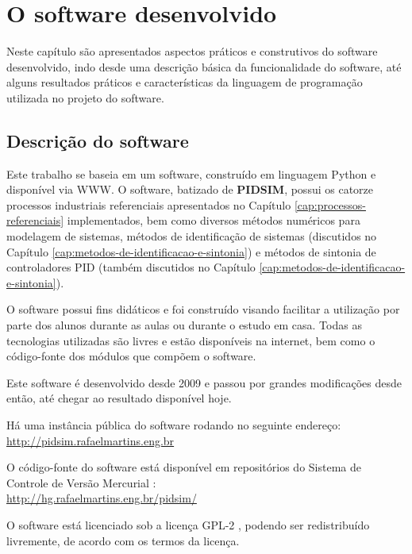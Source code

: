 \chapter{O software desenvolvido \label{cap:software}}

Neste capítulo são apresentados aspectos práticos e construtivos do
software desenvolvido, indo desde uma descrição básica da funcionalidade
do software, até alguns resultados práticos e características da linguagem
de programação utilizada no projeto do software.

\section{Descrição do software}

    Este trabalho se baseia em um software, construído em linguagem Python
    e disponível via \ac{WWW}. O software, batizado de \textbf{PIDSIM},
    possui os catorze processos industriais referenciais apresentados no Capítulo
    \ref{cap:processos-referenciais} implementados, bem como diversos
    métodos numéricos para modelagem de sistemas, métodos de identificação
    de sistemas (discutidos no Capítulo
    \ref{cap:metodos-de-identificacao-e-sintonia}) e métodos de sintonia de
    controladores \acs{PID} (também discutidos no Capítulo
    \ref{cap:metodos-de-identificacao-e-sintonia}).

    O software possui fins didáticos e foi construído visando facilitar a
    utilização por parte dos alunos durante as aulas ou durante o estudo em casa.
    Todas as tecnologias utilizadas são livres e estão disponíveis na internet,
    bem como o código-fonte dos módulos que compõem o software.

    Este software é desenvolvido desde 2009 e passou por grandes modificações
    desde então, até chegar ao resultado disponível hoje.

    Há uma instância pública do software rodando no seguinte endereço: \\
    \url{http://pidsim.rafaelmartins.eng.br}

    O código-fonte do software está disponível em repositórios do Sistema
    de Controle de Versão Mercurial \cite{Mercurial}: \\
    \url{http://hg.rafaelmartins.eng.br/pidsim/}

    O software está licenciado sob a licença \ac{GPL-2} \cite{GPL-2}, podendo ser redistribuído
    livremente, de acordo com os termos da licença.

